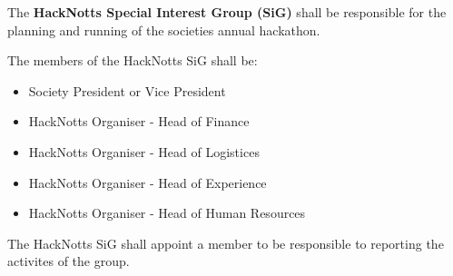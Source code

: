 \begin{clause}
    The \textbf{HackNotts Special Interest Group (SiG)} shall be responsible for the planning and running of the societies annual hackathon.
\end{clause}

\begin{subclause}
    The members of the HackNotts SiG shall be:
    \begin{itemize}
        \item Society President or Vice President
        \item HackNotts Organiser - Head of Finance
        \item HackNotts Organiser - Head of Logistices
        \item HackNotts Organiser - Head of Experience
        \item HackNotts Organiser - Head of Human Resources
    \end{itemize}
\end{subclause}

\begin{subclause}
    The HackNotts SiG shall appoint a member to be responsible to reporting the activites of the group.
\end{subclause}